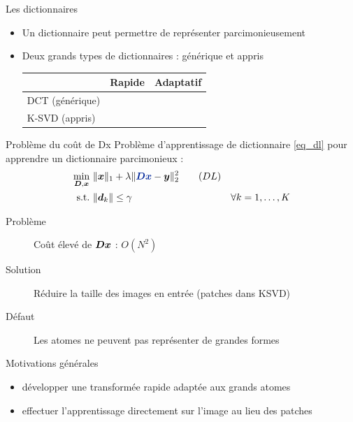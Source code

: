 \begin{frame}{Les dictionnaires}
\begin{itemize}
\item Un dictionnaire peut permettre de représenter parcimonieusement
\item Deux grands types de dictionnaires : générique et appris
	\begin{table}[] \centering
	\begin{tabular}{@{}lcc@{}} \toprule
	 & Rapide & Adaptatif \\ \midrule
	DCT (générique) & \Geq{\cmark} & \Req{\xmark}\\
	K-SVD (appris) & \Req{\xmark} & \Geq{\cmark} \\ \bottomrule
	\end{tabular}
	\end{table}
\end{itemize}
\end{frame}

\begin{frame}{Problème du coût de Dx}
Problème d'apprentissage de dictionnaire \eqref{eq_dl} pour apprendre un dictionnaire parcimonieux :
\begin{align} 
\underset{\D,\x}{\min}~ & \| \x \|_1 + \lambda \| \Beq{\D\x}-\y \|^2_2 \tag{$DL$}\label{eq_dl} \\
\text{s.t.}~ & \| \d_k \| \le \gamma & \forall k = 1,\dots,K\label{eq_dl_finite_norm} \notag
\end{align}
\begin{description}
	\item[Problème] Coût élevé de $\bm{D}\bm{x}$ : $O(N^2)$
	\item[Solution] Réduire la taille des images en entrée (patches dans KSVD)
	\item[Défaut] Les atomes ne peuvent pas représenter de grandes formes
\end{description}
\end{frame}


\begin{frame}{Motivations générales}
	\begin{itemize}
		\item développer une \alert{transformée rapide} adaptée aux grands atomes
		\item effectuer l'apprentissage \alert{directement sur l'image} au lieu des patches
	\end{itemize}
\end{frame}







